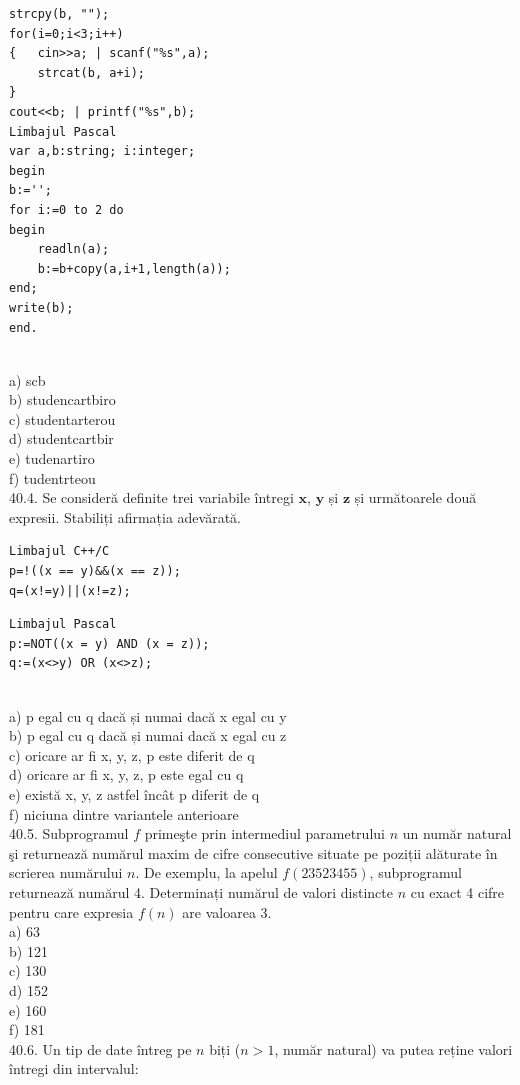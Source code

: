 \begin{itemize}
\begin{enumerate}
\begin{verbatim}
strcpy(b, "");
for(i=0;i<3;i++)
{   cin>>a; | scanf("%s",a);
    strcat(b, a+i);
}
cout<<b; | printf("%s",b);
Limbajul Pascal
var a,b:string; i:integer;
begin
b:='';
for i:=0 to 2 do
begin
    readln(a);
    b:=b+copy(a,i+1,length(a));
end;
write(b);
end.
\end{verbatim}
\\
a) scb
\\
b) studencartbiro
\\
c) studentarterou
\\
d) studentcartbir
\\
e) tudenartiro
\\
f) tudentrteou
\\
40.4. Se consideră definite trei variabile întregi $\mathbf{x}$, $\mathbf{y}$ și $\mathbf{z}$ și următoarele două expresii. Stabiliți afirmația adevărată.
\begin{verbatim}
Limbajul C++/C
p=!((x == y)&&(x == z));
q=(x!=y)||(x!=z);
\end{verbatim}
\begin{verbatim}
Limbajul Pascal
p:=NOT((x = y) AND (x = z));
q:=(x<>y) OR (x<>z);
\end{verbatim}
\\
a) p egal cu q dacă și numai dacă x egal cu y
\\
b) p egal cu q dacă și numai dacă x egal cu z
\\
c) oricare ar fi x, y, z, p este diferit de q
\\
d) oricare ar fi x, y, z, p este egal cu q
\\
e) există x, y, z astfel încât p diferit de q
\\
f) niciuna dintre variantele anterioare
\\
40.5. Subprogramul $f$ primeşte prin intermediul parametrului $n$ un număr natural şi returnează numărul maxim de cifre consecutive situate pe poziții alăturate în scrierea numărului $n$. De exemplu, la apelul $f(23523455)$, subprogramul returnează numărul 4. Determinați numărul de valori distincte $n$ cu exact 4 cifre pentru care expresia $f(n)$ are valoarea 3.
\\
a) 63
\\
b) 121
\\
c) 130
\\
d) 152
\\
e) 160
\\
f) 181
\\
40.6. Un tip de date întreg pe $n$ biți ($n>1$, număr natural) va putea reține valori întregi din intervalul:
\\

\end{enumerate}
\end{itemize}
